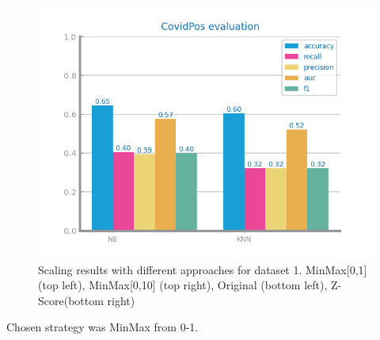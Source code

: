 \documentclass[10pt]{extarticle}
\begin{document}
\begin{figure}[H]
\includegraphics[scale=0.80]{images/dataset1/data_preparation/CovidPos_scaling_treat_Z-Score.png}
\caption{Scaling results with different approaches for dataset 1. MinMax[0,1] (top left), MinMax[0,10] (top right), Original (bottom left), Z-Score(bottom right)}
\end{figure}
Chosen strategy was MinMax from 0-1.
\end{document}

